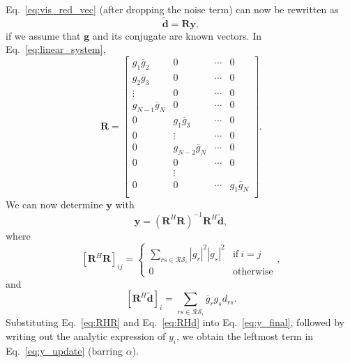 \documentclass[useAMS,usenatbib]{mn2e}
\newcommand{\conj}[1]{\overline{#1}}
\begin{document}
Eq.~\eqref{eq:vis_red_vec} (after dropping the noise term) can now be rewritten as 
\begin{equation}
\label{eq:linear_system}
\widetilde{\boldsymbol{d}} = \boldsymbol{R}\boldsymbol{y}, 
\end{equation}
if we assume that $\boldsymbol{g}$ and its conjugate are known vectors. In Eq.~\eqref{eq:linear_system},
\begin{equation}
\boldsymbol{R} = 
\begin{bmatrix}
g_1\conj{g}_2 & 0 & \cdots & 0\\
g_2\conj{g}_3 & 0 & \cdots & 0\\
\vdots & 0 & \cdots & 0\\
g_{N-1}\conj{g}_N & 0 & \cdots & 0\\
0 & g_1\conj{g}_3 & \cdots & 0\\
0 & \vdots & \cdots & 0\\
0 & g_{N-2}\conj{g}_N & \cdots & 0\\
0 & 0 & \cdots & 0\\
  & \vdots & \\
0 & 0 & \cdots & g_1\conj{g}_N\\  
\end{bmatrix}.
\end{equation}
We can now determine $\boldsymbol{y}$ with
\begin{equation}
\label{eq:y_final}
\boldsymbol{y} = (\boldsymbol{R}^H\boldsymbol{R})^{-1}\boldsymbol{R}^H\widetilde{\boldsymbol{d}}, 
\end{equation}
where 
\begin{equation}
\label{eq:RHR}
[\boldsymbol{R}^H\boldsymbol{R}]_{ij} = 
\begin{cases}
\sum_{rs\in\mathcal{RS}_i} |g_r|^2|g_s|^2 &\textrm{if}~i=j\\
0&\textrm{otherwise}
\end{cases},
\end{equation}
and
\begin{equation}
\label{eq:RHd}
[\boldsymbol{R}^H\widetilde{\boldsymbol{d}}]_i = \sum_{rs\in\mathcal{RS}_i} \conj{g}_r g_s d_{rs}. 
\end{equation}
Substituting Eq.~\eqref{eq:RHR} and Eq.~\eqref{eq:RHd} into Eq.~\eqref{eq:y_final}, followed by writing out the analytic expression of $y_i$, we obtain
the leftmost term in Eq.~\eqref{eq:y_update} (barring $\alpha$).
\label{lastpage}
\end{document}
